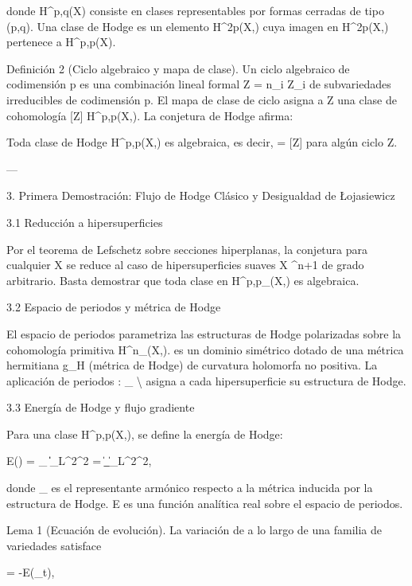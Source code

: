 \documentclass[12pt,twoside]{book}
\begin{document}
donde H^{p,q}(X) consiste en clases representables por formas cerradas de tipo (p,q). Una clase de Hodge es un elemento \alpha \in H^{2p}(X,) cuya imagen en H^{2p}(X,) pertenece a H^{p,p}(X).

Definición 2 (Ciclo algebraico y mapa de clase). Un ciclo algebraico de codimensión p es una combinación lineal formal Z = \sum n_i Z_i de subvariedades irreducibles de codimensión p. El mapa de clase de ciclo asigna a Z una clase de cohomología [Z] \in H^{p,p}(X,). La conjetura de Hodge afirma:

Toda clase de Hodge \alpha \in H^{p,p}(X,) es algebraica, es decir, \alpha = [Z] para algún ciclo Z.

---

3. Primera Demostración: Flujo de Hodge Clásico y Desigualdad de Łojasiewicz

3.1 Reducción a hipersuperficies

Por el teorema de Lefschetz sobre secciones hiperplanas, la conjetura para cualquier X se reduce al caso de hipersuperficies suaves X \subset {}^{n+1} de grado arbitrario. Basta demostrar que toda clase en H^{p,p}_{}(X,) es algebraica.

3.2 Espacio de periodos y métrica de Hodge

El espacio de periodos  parametriza las estructuras de Hodge polarizadas sobre la cohomología primitiva H^n_{}(X,).  es un dominio simétrico dotado de una métrica hermitiana g_H (métrica de Hodge) de curvatura holomorfa no positiva. La aplicación de periodos \Phi: _{} \to \Gamma\backslash{} asigna a cada hipersuperficie su estructura de Hodge.

3.3 Energía de Hodge y flujo gradiente

Para una clase \alpha \in H^{p,p}(X,), se define la energía de Hodge:

E(\alpha) = \inf_{\omega \in \alpha} \|\omega\|_{L^2}^2 = \|\omega_{}\|_{L^2}^2,

donde \omega_{} es el representante armónico respecto a la métrica inducida por la estructura de Hodge. E es una función analítica real sobre el espacio de periodos.

Lema 1 (Ecuación de evolución). La variación de \alpha a lo largo de una familia de variedades satisface

 = -\nabla E(\alpha_t),
\end{document}
